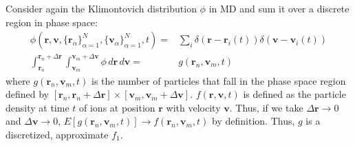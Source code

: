 \documentclass{article}
\begin{document}
Consider again the Klimontovich distribution $\phi$ in MD and sum it over a discrete region in phase space:
\begin{align*}
\phi(\mathbf{r},\mathbf{v},\{\mathbf{r}_\alpha\}_{\alpha=1}^N,\{\mathbf{v}_\alpha\}_{\alpha=1}^N,t)=&\sum_{i}\delta\left(\mathbf{r}-\mathbf{r}_i(t)\right)\delta\left(\mathbf{v}-\mathbf{v}_i(t)\right)\\
\int_{\mathbf{r}_n}^{\mathbf{r}_n+\Delta \mathbf{r}} \int_{\mathbf{v}_m}^{\mathbf{v}_m+\Delta \mathbf{v}}\phi \,d\mathbf{r}\,d\mathbf{v} =& g(\mathbf{r}_n,\mathbf{v}_m,t)
\end{align*}where $g(\mathbf{r}_n,\mathbf{v}_m,t)$ is the number of particles that fall in the phase space region defined by $[\mathbf{r}_n,\mathbf{r}_n+\Delta \mathbf{r}]\times [\mathbf{v}_m,\mathbf{v}_m+\Delta \mathbf{v}]$. $f(\mathbf{r},\mathbf{v},t)$ is defined as the particle density at time $t$ of ions at position $\mathbf{r}$ with velocity $\mathbf{v}$. Thus, if we take $\Delta \mathbf{r}\to 0$ and $\Delta \mathbf{v}\to0$, $E[g(\mathbf{r}_n,\mathbf{v}_m,t)]\to f(\mathbf{r}_n,\mathbf{v}_m,t)$ by definition. Thus, $g$ is a discretized, approximate $f_1$.
\end{document}
